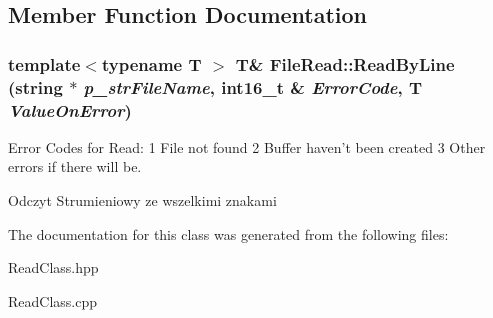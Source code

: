 \subsection{Member Function Documentation}
\hypertarget{classFileRead_afd22580b16770d0abaf75c63098e6103}{
\subsubsection[{ReadByLine}]{\setlength{\rightskip}{0pt plus 5cm}template$<$typename T $>$ T\& FileRead::ReadByLine (string $\ast$ {\em p\_\-strFileName}, \/  int16\_\-t \& {\em ErrorCode}, \/  T {\em ValueOnError})}}
\label{classFileRead_afd22580b16770d0abaf75c63098e6103}
Error Codes for Read: 1 File not found 2 Buffer haven't been created 3 Other errors if there will be. 

Odczyt Strumieniowy ze wszelkimi znakami

The documentation for this class was generated from the following files:\begin{DoxyCompactItemize}
\item 
ReadClass.hpp\item 
ReadClass.cpp\end{DoxyCompactItemize}
